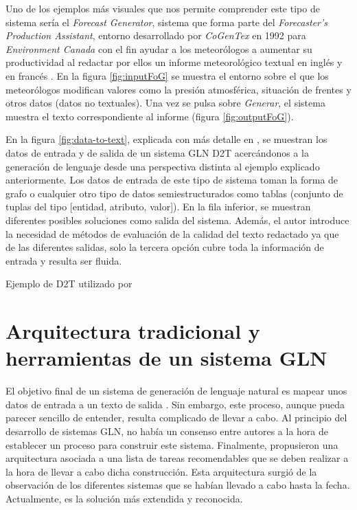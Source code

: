 Uno de los ejemplos más visuales que nos permite comprender este tipo de sistema sería el \textit{Forecast Generator}, sistema que forma parte del \textit{Forecaster's Production Assistant}, entorno desarrollado por \textit{CoGenTex} en 1992 para \textit{Environment Canada} con el fin ayudar a los meteorólogos a aumentar su productividad al redactar por ellos un informe meteorológico textual en inglés y en francés \citep{goldberg1994using}. En la figura  \ref{fig:inputFoG} se muestra el entorno sobre el que los meteorólogos modifican valores como la presión atmosférica, situación de frentes y otros datos (datos no textuales). Una vez se pulsa sobre \textit{Generar}, el sistema muestra el texto correspondiente al informe (figura \ref{fig:outputFoG}). 


En la figura \ref{fig:data-to-text}, explicada con más detalle en \cite{sai2020survey}, se muestran los datos de entrada y de salida de un sistema GLN D2T acercándonos a la generación de lenguaje desde una perspectiva distinta al ejemplo explicado anteriormente.  Los datos de entrada de este tipo de sistema toman la forma de grafo o cualquier otro tipo de datos semiestructurados como tablas (conjunto de tuplas del tipo [entidad, atributo, valor]). En la fila inferior, se muestran diferentes posibles soluciones como salida del sistema. Además, el autor introduce la necesidad de métodos de evaluación de la calidad del texto redactado ya que de las diferentes salidas, solo la tercera opción cubre toda la información de entrada y resulta ser fluida.

%
{Ejemplo de D2T utilizado por \cite{sai2020survey}}

\section{Arquitectura tradicional y herramientas de un sistema GLN}
\label{sec:arquitectura_tradicional}
El objetivo final de un sistema de generación de lenguaje natural es mapear unos datos de entrada a un texto de salida \citep{reiter1997building}. Sin embargo, este proceso, aunque pueda parecer sencillo de entender, resulta complicado de llevar a cabo. Al principio del desarrollo de sistemas GLN, no había un consenso entre autores a la hora de establecer un proceso para construir este sistema. Finalmente, \cite{reiter1997building} propusieron una arquitectura asociada a una lista de tareas recomendables que se deben realizar a la hora de llevar a cabo dicha construcción. Esta arquitectura surgió de la observación de los diferentes sistemas que se habían llevado a cabo hasta la fecha.  Actualmente, es la solución más extendida y reconocida.

